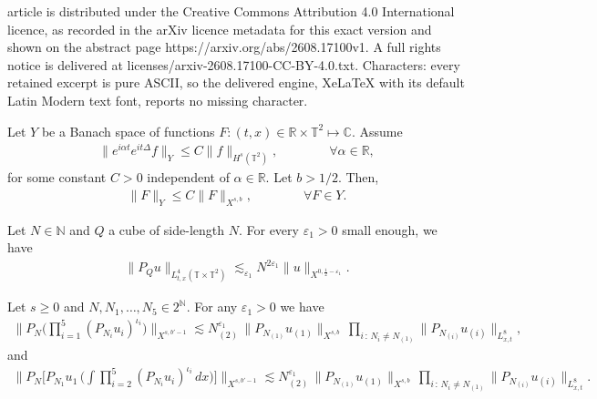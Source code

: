 \documentclass[10pt,a4paper]{amsart}
\begin{document}
article is distributed under the Creative Commons Attribution 4.0 International licence, as recorded in the arXiv licence metadata for this exact version and shown on the abstract page https://arxiv.org/abs/2608.17100v1. A full rights notice is delivered at licenses/arxiv-2608.17100-CC-BY-4.0.txt. Characters: every retained excerpt is pure ASCII, so the delivered engine, XeLaTeX with its default Latin Modern text font, reports no missing character.
	\begin{lem}\label{lemma:TransferLemma}
		Let $Y$ be a Banach space of functions 
		$F : (t,x) \in \mathbb{R} \times \mathbb{T}^2 \mapsto \mathbb{C}$. 
		Assume
		\begin{align*}
			\| e^{i \alpha t} e^{i t \Delta} f \|_Y \leq C \| f \|_{H^s(\mathbb{T}^2)},
            \qquad \qquad \forall \alpha \in \mathbb R,
		\end{align*}
		for some constant $C > 0$ independent of $\alpha \in \mathbb{R}$. Let $b > 1/2$. Then,
		\begin{align*}
			\|F\|_Y \leq C \|F\|_{X^{s,b}}, 
            \qquad \qquad  \forall F \in Y. 
		\end{align*}
	\end{lem}

    \begin{lem}\label{lemma:st-int}
    Let $N \in \mathbb N$ and $Q$ a cube of side-length $N$. For every $\varepsilon_1 > 0$ small enough, we have
    \begin{align*}
        \|P_Qu\|_{L^4_{t,x}( \mathbb T \times \mathbb{T}^2)} \lesssim_{\varepsilon_1} N^{2\varepsilon_1} \|u\|_{X^{0,\frac{1}{2} - \varepsilon_1}}.
    \end{align*}
\end{lem}

\begin{lem}\label{lemma:Multilinear_Estimates}
Let $s \geq 0$
and $N, N_1, \ldots, N_5 \in 2^{\mathbb{N}}$. For any $\varepsilon_1 > 0$ we have
\begin{align}\label{eq:Multilineal_Main}
    \bigg\lVert P_N \Big( \prod_{i=1}^5 (P_{N_i} u_i)^{\iota_i} \Big) 
    \bigg\rVert_{X^{s, b'-1}} 
    \lesssim 
    N_{(2)}^{\varepsilon_1} \, 
    \lVert P_{N_{(1)}} u_{(1)} \rVert_{X^{s,b}} \, 
    \prod_{i \, : \, N_i \neq N_{(1)}}
    \lVert P_{N_{(i)}} u_{(i)} \rVert_{L^8_{x,t}}, 
    \end{align}
and     \begin{align}\label{eq:Multilineal_Secondary}
    \bigg\lVert P_N \bigg[ 
    P_{N_1} u_1 \, 
    \bigg(\int \prod_{i=2}^5 (P_{N_i} u_i)^{\iota_i}  \, dx 
    \bigg)
    \bigg] 
    \bigg\rVert_{X^{s, b'-1}} 
    \lesssim 
    N_{(2)}^{\varepsilon_1} \, 
    \lVert P_{N_{(1)}} u_{(1)} \rVert_{X^{s,b}} \, 
    \prod_{i \, : \, N_i \neq N_{(1)}} \lVert P_{N_{(i)}} u_{(i)} \rVert_{L^8_{x,t}}.
    \end{align}
\end{lem}
\end{document}
